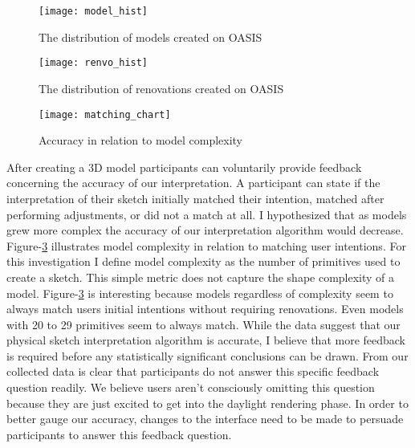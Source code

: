 \begin{figure}[h]
	\centering
	\texttt{[image: model\_hist]}
	\caption{The distribution of models created on OASIS}
	\label{fig:model_hist}
\end{figure}


\begin{figure}[h]
	\centering
	\texttt{[image: renvo\_hist]}
	\caption{The distribution of renovations created on OASIS}
	\label{fig:renvo_hist}
\end{figure}


\begin{figure}[h]
	\centering
	\texttt{[image: matching\_chart]}
	\caption{Accuracy in relation to model complexity}
	\label{fig:matching_chart}
\end{figure}

After creating a 3D model participants can voluntarily provide feedback concerning the accuracy of our interpretation.
A participant can state if the  interpretation of their sketch initially matched their intention,  matched after performing adjustments, or did not a match at all.
I hypothesized that as models grew more complex the accuracy of our interpretation algorithm would decrease.
Figure-\ref{fig:matching_chart} illustrates model complexity in relation to matching user intentions.
For this investigation I define model complexity as the number of primitives used to create a sketch. This simple metric does not capture the shape complexity of a model.
Figure-\ref{fig:matching_chart} is interesting because models regardless of complexity seem to always match users initial intentions without requiring renovations.
Even models with 20 to 29 primitives seem to always match.
While the data suggest that our physical sketch interpretation algorithm is accurate, I believe that more feedback is required before any statistically significant conclusions can be drawn.
From our collected data is clear that participants do not answer this specific feedback question readily.
We believe users aren't consciously omitting this question because they are just excited to get into the daylight rendering phase.
In order to better gauge our accuracy, changes to the interface need to be made to persuade participants to answer this feedback question. \\




